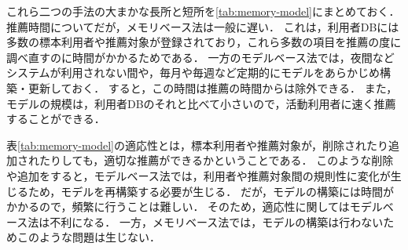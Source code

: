 これら二つの手法の大まかな長所と短所を\ref{tab:memory-model}にまとめておく．
推薦時間についてだが，メモリベース法は一般に遅い．
これは，利用者DBには多数の標本利用者や推薦対象が登録されており，これら多数の項目を推薦の度に調べ直すのに時間がかかるためである．
一方のモデルベース法では，夜間などシステムが利用されない間や，毎月や毎週など定期的にモデルをあらかじめ構築・更新しておく．
すると，この時間は推薦の時間からは除外できる．
また，モデルの規模は，利用者DBのそれと比べて小さいので，活動利用者に速く推薦することができる．

表\ref{tab:memory-model}の適応性とは，標本利用者や推薦対象が，削除されたり追加されたりしても，適切な推薦ができるかということである．
このような削除や追加をすると，モデルベース法では，利用者や推薦対象間の規則性に変化が生じるため，モデルを再構築する必要が生じる．
だが，モデルの構築には時間がかかるので，頻繁に行うことは難しい．
そのため，適応性に関してはモデルベース法は不利になる．
一方，メモリベース法では，モデルの構築は行わないためこのような問題は生じない．

